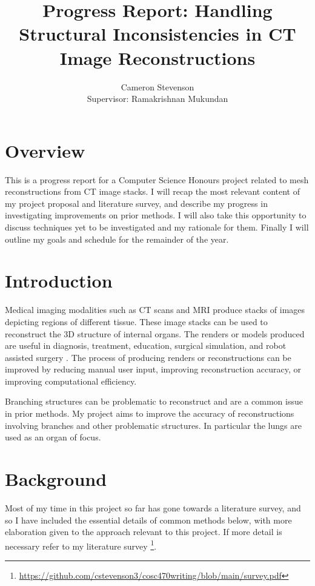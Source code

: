 \documentclass[11pt]{article}
\title{Progress Report: Handling Structural Inconsistencies in CT Image Reconstructions}
\author{Cameron Stevenson\\[0.5cm]{\small Supervisor: Ramakrishnan Mukundan}}
\begin{document}
\maketitle

\section{Overview}

This is a progress report for a Computer Science Honours project related to mesh reconstructions from CT image stacks. I will recap the most relevant content of my project proposal and literature survey, and describe my progress in investigating improvements on prior methods. I will also take this opportunity to discuss techniques yet to be investigated and my rationale for them. Finally I will outline my goals and schedule for the remainder of the year.

\section{Introduction}

Medical imaging modalities such as CT scans and MRI produce stacks of images depicting regions of different tissue. These image stacks can be used to reconstruct the 3D structure of internal organs. The renders or models produced are useful in diagnosis, treatment, education, surgical simulation, and robot assisted surgery \cite{mackay2019robust, mukundan2016reconstruction}. The process of producing renders or reconstructions can be improved by reducing manual user input, improving reconstruction accuracy, or improving computational efficiency.

Branching structures can be problematic to reconstruct and are a common issue in prior methods. My project aims to improve the accuracy of reconstructions involving branches and other problematic structures. In particular the lungs are used as an organ of focus. 

\section{Background}

Most of my time in this project so far has gone towards a literature survey, and so I have included the essential details of common methods below, with more elaboration given to the approach relevant to this project. If more detail is necessary refer to my literature survey \footnote{\url{https://github.com/cstevenson3/cosc470writing/blob/main/survey.pdf}}.
\end{document}
